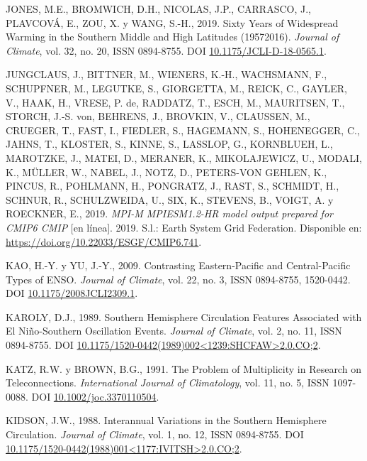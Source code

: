 \documentclass[12pt,oneside,a4paper]{reedthesis}
\newlength{\cslhangindent}
\newenvironment{CSLReferences}[2] %
 {%
  \setlength{\parindent}{0pt}
  \ifodd #1 \everypar{\setlength{\hangindent}{\cslhangindent}}\ignorespaces\fi
  \ifnum #2 > 0
  \setlength{\parskip}{#2\baselineskip}
  \fi
 }%
 {}
\begin{document}
\begin{CSLReferences}{1}{0}
\leavevmode{}%
JONES, M.E., BROMWICH, D.H., NICOLAS, J.P., CARRASCO, J., PLAVCOVÁ, E., ZOU, X. y WANG, S.-H., 2019. Sixty {Years} of {Widespread Warming} in the {Southern Middle} and {High Latitudes} (1957{\textendash}2016). \emph{Journal of Climate}, vol. 32, no. 20, ISSN 0894-8755. DOI \href{https://doi.org/10.1175/JCLI-D-18-0565.1}{10.1175/JCLI-D-18-0565.1}.

\leavevmode{}%
JUNGCLAUS, J., BITTNER, M., WIENERS, K.-H., WACHSMANN, F., SCHUPFNER, M., LEGUTKE, S., GIORGETTA, M., REICK, C., GAYLER, V., HAAK, H., VRESE, P. de, RADDATZ, T., ESCH, M., MAURITSEN, T., STORCH, J.-S. von, BEHRENS, J., BROVKIN, V., CLAUSSEN, M., CRUEGER, T., FAST, I., FIEDLER, S., HAGEMANN, S., HOHENEGGER, C., JAHNS, T., KLOSTER, S., KINNE, S., LASSLOP, G., KORNBLUEH, L., MAROTZKE, J., MATEI, D., MERANER, K., MIKOLAJEWICZ, U., MODALI, K., MÜLLER, W., NABEL, J., NOTZ, D., PETERS-VON GEHLEN, K., PINCUS, R., POHLMANN, H., PONGRATZ, J., RAST, S., SCHMIDT, H., SCHNUR, R., SCHULZWEIDA, U., SIX, K., STEVENS, B., VOIGT, A. y ROECKNER, E., 2019. \emph{MPI-M MPIESM1.2-HR model output prepared for CMIP6 CMIP} {[}en línea{]}. 2019. S.l.: Earth System Grid Federation. Disponible en: \url{https://doi.org/10.22033/ESGF/CMIP6.741}.

\leavevmode{}%
KAO, H.-Y. y YU, J.-Y., 2009. Contrasting {Eastern-Pacific} and {Central-Pacific Types} of {ENSO}. \emph{Journal of Climate}, vol. 22, no. 3, ISSN 0894-8755, 1520-0442. DOI \href{https://doi.org/10.1175/2008JCLI2309.1}{10.1175/2008JCLI2309.1}.

\leavevmode{}%
KAROLY, D.J., 1989. Southern {Hemisphere Circulation Features Associated} with {El Ni{ñ}o-Southern Oscillation Events}. \emph{Journal of Climate}, vol. 2, no. 11, ISSN 0894-8755. DOI \href{https://doi.org/10.1175/1520-0442(1989)002\%3C1239:SHCFAW\%3E2.0.CO;2}{10.1175/1520-0442(1989)002\textless1239:SHCFAW\textgreater2.0.CO;2}.

\leavevmode{}%
KATZ, R.W. y BROWN, B.G., 1991. The Problem of Multiplicity in Research on Teleconnections. \emph{International Journal of Climatology}, vol. 11, no. 5, ISSN 1097-0088. DOI \href{https://doi.org/10.1002/joc.3370110504}{10.1002/joc.3370110504}.

\leavevmode{}%
KIDSON, J.W., 1988. Interannual {Variations} in the {Southern Hemisphere Circulation}. \emph{Journal of Climate}, vol. 1, no. 12, ISSN 0894-8755. DOI \href{https://doi.org/10.1175/1520-0442(1988)001\%3C1177:IVITSH\%3E2.0.CO;2}{10.1175/1520-0442(1988)001\textless1177:IVITSH\textgreater2.0.CO;2}.


\end{CSLReferences}
\end{document}
